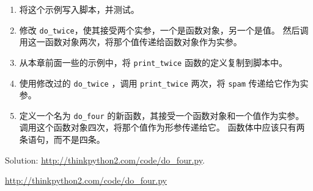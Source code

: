 \begin{exercise}
\begin{enumerate}
\item 将这个示例写入脚本，并测试。

\item 修改 \lstinline{do_twice}，使其接受两个实参，一个是函数对象，另一个是值。
   然后调用这一函数对象两次，将那个值传递给函数对象作为实参。

\item 从本章前面一些的示例中，将 \lstinline{print_twice} 函数的定义复制到脚本中。

\item 使用修改过的 \lstinline{do_twice} ，调用 \lstinline{print_twice} 两次，将 \lstinline{spam} 传递给它作为实参。

\item 定义一个名为 \lstinline{do_four} 的新函数，其接受一个函数对象和一个值作为实参。 调用这个函数对象四次，将那个值作为形参传递给它。 函数体中应该只有两条语句，而不是四条。

\end{enumerate}

Solution: \url{http://thinkpython2.com/code/do_four.py}.

\href{参考答案}{http://thinkpython2.com/code/do_four.py}

\end{exercise}



